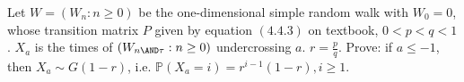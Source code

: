 \documentclass{ctexart}
\begin{document}
\begin{problem}\label{pro:4}
  Let \(W=(W_n:n \geq 0)\) be the one-dimensional simple random walk with \(W_0=0\), whose transition matrix \(P\) given by equation \((4.4.3)\)
  on textbook, \(0< p<q<1\).
  \(X_a\) is the times of \((W_{n \AND \tau}:n \geq 0)\) undercrossing \(a\).
  \(r=\frac{p}{q}\).
  Prove: if \(a \leq -1\), then \(X_a \sim G(1-r)\), i.e. \(\mathbb{P}(X_a=i)=r^{i-1}(1-r),i \geq 1\).
\end{problem}
\end{document}
